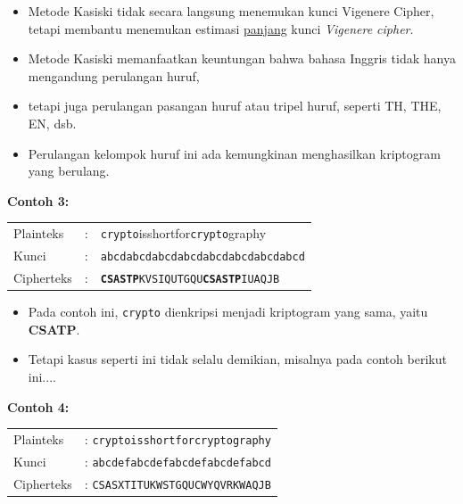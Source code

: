 \documentclass{article}
\begin{document}
\begin{itemize}
    \item Metode Kasiski tidak secara langsung menemukan kunci Vigenere Cipher, tetapi membantu menemukan estimasi \underline{panjang} kunci \textit{Vigenere cipher}.
    \item Metode Kasiski memanfaatkan keuntungan bahwa bahasa Inggris tidak hanya mengandung perulangan huruf,
    \item tetapi juga perulangan pasangan huruf atau tripel huruf, seperti TH, THE, EN, dsb.
    \item Perulangan kelompok huruf ini ada kemungkinan menghasilkan kriptogram yang berulang.
\end{itemize}

\newpage


\textbf{Contoh 3:}

\begin{tabular}{lll}
Plainteks & : & \texttt{\color{red}crypto}isshortfor\texttt{\color{red}crypto}graphy} \\
Kunci & : & \texttt{abcdabcdabcdabcdabcdabcdabcdabcd} \\
Cipherteks & : & \texttt{\textbf{CSASTP}KVSIQUTGQU\textbf{CSASTP}IUAQJB} \\
\end{tabular}

\vspace{10mm}

\begin{itemize}
    \item Pada contoh ini, \texttt{crypto} dienkripsi menjadi kriptogram yang sama, yaitu \textbf{CSATP}.
    \item Tetapi kasus seperti ini tidak selalu demikian, misalnya pada contoh berikut ini....
\end{itemize}

\newpage


\textbf{Contoh 4:}

\begin{tabular}{ll}
Plainteks & : \texttt{cryptoisshortforcryptography} \\
Kunci & : \texttt{abcdefabcdefabcdefabcdefabcd} \\
Cipherteks & : \texttt{CSASXTITUKWSTGQUCWYQVRKWAQJB} \\
\end{tabular}
\end{document}
